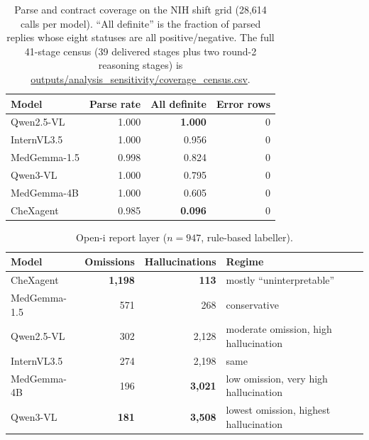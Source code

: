 \begin{table}[H]
\centering
\small
\caption{Parse and contract coverage on the NIH shift grid (28,614 calls per model). ``All definite'' is the fraction of parsed replies whose eight statuses are all positive/negative. The full 41-stage census (39 delivered stages plus two round-2 reasoning stages) is \url{outputs/analysis_sensitivity/coverage_census.csv}.}
\label{tab:coverage}
\begin{tabular}{lrrr}
\toprule
Model & Parse rate & All definite & Error rows \\
\midrule
Qwen2.5-VL & 1.000 & \textbf{1.000} & 0 \\
InternVL3.5 & 1.000 & 0.956 & 0 \\
MedGemma-1.5 & 0.998 & 0.824 & 0 \\
Qwen3-VL & 1.000 & 0.795 & 0 \\
MedGemma-4B & 1.000 & 0.605 & 0 \\
CheXagent & 0.985 & \textbf{0.096} & 0 \\
\bottomrule
\end{tabular}
\end{table}

\begin{table}[H]
\centering
\small
\caption{Open-i report layer ($n=947$, rule-based labeller).}
\label{tab:report}
\begin{tabular}{lrrl}
\toprule
Model & Omissions & Hallucinations & Regime \\
\midrule
CheXagent & \textbf{1,198} & \textbf{113} & mostly ``uninterpretable'' \\
MedGemma-1.5 & 571 & 268 & conservative \\
Qwen2.5-VL & 302 & 2,128 & moderate omission, high hallucination \\
InternVL3.5 & 274 & 2,198 & same \\
MedGemma-4B & 196 & \textbf{3,021} & low omission, very high hallucination \\
Qwen3-VL & \textbf{181} & \textbf{3,508} & lowest omission, highest hallucination \\
\bottomrule
\end{tabular}
\end{table}


